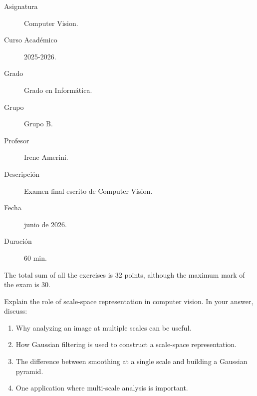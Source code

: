 \documentclass[12pt]{article}
\begin{document}

    
	

    \begin{description}
        \item[Asignatura] Computer Vision.
        \item[Curso Académico] 2025-2026.
        \item[Grado] Grado en Informática.
        \item[Grupo] Grupo B.
        \item[Profesor] Irene Amerini.
        \item[Descripción] Examen final escrito de Computer Vision.
        \item[Fecha] junio de 2026.
        \item[Duración] 60 min.
    
    \end{description}
    \newpage


    \begin{observacion}
        The total sum of all the exercises is 32 points, although the maximum mark of the exam is 30.
    \end{observacion}

    \begin{ejercicio}[8 points]
    Explain the role of scale-space representation in computer vision. In your answer, discuss:
    \begin{enumerate}
        \item[a)] Why analyzing an image at multiple scales can be useful.
        \item[b)] How Gaussian filtering is used to construct a scale-space representation.
        \item[c)] The difference between smoothing at a single scale and building a Gaussian pyramid.
        \item[d)] One application where multi-scale analysis is important.
    \end{enumerate}
    \end{ejercicio}
\end{document}
